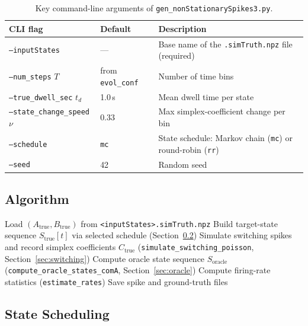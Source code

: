 \documentclass[11pt]{article}
\begin{document}
\begin{table}[h]
\centering
\begin{tabular}{lll}
\toprule
CLI flag & Default & Description \\
\midrule
\texttt{--inputStates} & --- &
  Base name of the \texttt{.simTruth.npz} file (required) \\
\texttt{--num\_steps} $T$ & from \texttt{evol\_conf} &
  Number of time bins \\
\texttt{--true\_dwell\_sec} $t_d$ & 1.0\,s &
  Mean dwell time per state \\
\texttt{--state\_change\_speed} $\nu$ & 0.33 &
  Max simplex-coefficient change per bin \\
\texttt{--schedule} & \texttt{mc} &
  State schedule: Markov chain (\texttt{mc}) or round-robin (\texttt{rr}) \\
\texttt{--seed} & 42 & Random seed \\
\bottomrule
\end{tabular}
\caption{Key command-line arguments of \texttt{gen\_nonStationarySpikes3.py}.}
\label{tab:nonstat_args}
\end{table}

\subsection{Algorithm}

\begin{algorithm}[H]
\caption{Non-Stationary Spike Generation
  (\texttt{gen\_nonStationarySpikes3.py})}
\begin{algorithmic}[1]
\STATE Load $(A_{\text{true}}, B_{\text{true}})$ from
       \texttt{<inputStates>.simTruth.npz}
\STATE Build target-state sequence $S_{\text{true}}[t]$
       via selected schedule (Section~\ref{sec:scheduling})
\STATE Simulate switching spikes and record simplex coefficients $C_{\text{true}}$
       (\texttt{simulate\_switching\_poisson}, Section~\ref{sec:switching})
\STATE Compute oracle state sequence $S_{\text{oracle}}$
       (\texttt{compute\_oracle\_states\_comA}, Section~\ref{sec:oracle})
\STATE Compute firing-rate statistics (\texttt{estimate\_rates})
\STATE Save spike and ground-truth files
\end{algorithmic}
\end{algorithm}

\subsection{State Scheduling}
\label{sec:scheduling}
\end{document}
